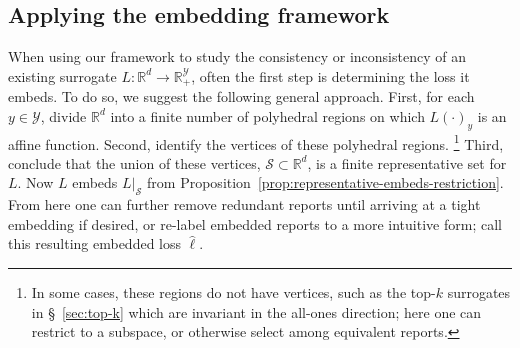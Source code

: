 \documentclass[11pt]{article}
\newcommand{\Comments}{1}
\newcommand{\mynote}[2]{\ifnum\Comments=1\textcolor{#1}{#2}\fi}
\newcommand{\jessie}[1]{\mynote{teal}{[JF: #1]}}
\newcommand{\reals}{\mathbb{R}}
\newcommand{\prop}[1]{\mathrm{prop}[#1]}
\newcommand{\Sc}{\mathcal{S}}
\newcommand{\Y}{\mathcal{Y}}
\begin{document}

\subsection{Applying the embedding framework}
\label{sec:apply-embedd-fram}

When using our framework to study the consistency or inconsistency of an existing surrogate $L:\reals^d \to \reals^\Y_+$, often the first step is determining the loss it embeds.
To do so, we suggest the following general approach.
First, for each $y\in\Y$, divide $\reals^d$ into a finite number of polyhedral regions on which $L(\cdot)_y$ is an affine function.
Second, identify the vertices of these polyhedral regions.%
\footnote{In some cases, these regions do not have vertices, such as the top-$k$ surrogates in \S~\ref{sec:top-k} which are invariant in the all-ones direction; here one can restrict to a subspace, or otherwise select among equivalent reports.}
Third, conclude that the union of these vertices, $\Sc\subset\reals^d$, is a finite representative set for $L$.
Now $L$ embeds $L|_\Sc$ from Proposition~\ref{prop:representative-embeds-restriction}.
From here one can further remove redundant reports until arriving at a tight embedding if desired, or re-label embedded reports to a more intuitive form; call this resulting embedded loss $\hat \ell$.
\end{document}
